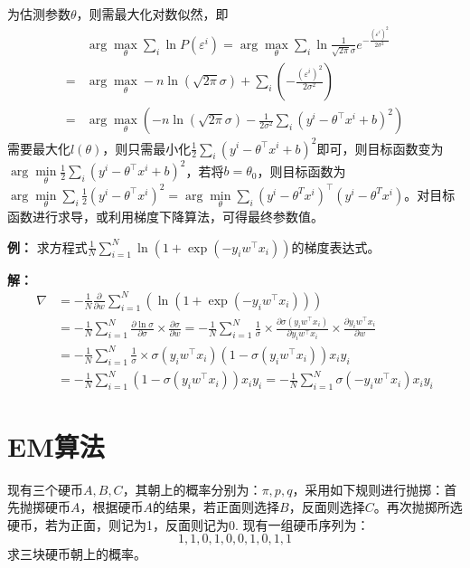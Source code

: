 \documentclass[12pt,a4paper]{article}
\begin{document}
  为估测参数$\theta$，则需最大化对数似然，即
  $$
  \begin{aligned}
    &\arg\max\limits_\theta \sum\limits_i \ln P(\varepsilon^i)= \arg\max\limits_\theta \sum\limits_i \ln \frac{1}{\sqrt{2\pi}\sigma} e^{-\frac{(\varepsilon^i)^2}{2\sigma^2}} \\ 
    =& \arg\max\limits_\theta -n\ln \left(\sqrt{2\pi} \sigma \right) + \sum_i \left(-\frac{(\varepsilon^i)^2}{2\sigma^2}\right) \\ 
    = & \arg\max\limits_\theta \left(-n\ln \left(\sqrt{2\pi} \sigma \right) - \frac{1}{2\sigma^2}\sum_i (y^i-\theta^\top x^i + b)^2 \right)
  \end{aligned}
  $$
  需要最大化$l(\theta)$，则只需最小化$\frac{1}{2}\sum_i (y^i-\theta^\top x^i + b)^2$即可，则目标函数变为$\arg\min\limits_\theta \frac{1}{2}\sum_i (y^i-\theta^\top x^i + b)^2$，若将$b=\theta_0$，则目标函数为$\arg\min\limits_\theta \sum\limits_i \frac{1}{2}(y^i-\theta^\top x^i)^2=\arg\min\limits_\theta \sum\limits_i (y^i-\theta^Tx^i)^\top(y^i-\theta^Tx^i)$。对目标函数进行求导，或利用梯度下降算法，可得最终参数值。

  \textbf{例：} 求方程式$\frac{1}{N}\sum\limits_{i=1}^N \ln(1+\exp(-y_iw^\top x_i))$的梯度表达式。

  \textbf{解：} 
  $$
  \begin{aligned}
    \nabla &=-\frac{1}{N} \frac{\partial}{\partial w} \sum\limits_{i=1}^N \left(\ln (1 + \exp(-y_i w^\top x_i))\right) \\ 
    &= -\frac{1}{N} \sum_{i=1}^N \frac{\partial \ln \sigma}{\partial \sigma} \times \frac{\partial \sigma}{\partial w} = -\frac{1}{N} \sum_{i=1}^N  \frac{1}{\sigma} \times \frac{\partial \sigma(y_iw^\top x_i)}{\partial y_iw^\top x_i} \times \frac{\partial y_iw^\top x_i}{\partial w} \\ 
    &= -\frac{1}{N} \sum_{i=1}^N  \frac{1}{\sigma} \times \sigma(y_i w^\top x_i)(1-\sigma(y_i w^\top x_i)) x_i y_i \\ 
    &= -\frac{1}{N} \sum_{i=1}^N (1-\sigma(y_i w^\top x_i))x_i y_i = -\frac{1}{N} \sum_{i=1}^N \sigma(-y_i w^\top x_i)x_i y_i
  \end{aligned}
  $$

  \section{EM算法}
  现有三个硬币$A, B,C$，其朝上的概率分别为：$\pi, p, q$，采用如下规则进行抛掷：首先抛掷硬币$A$，根据硬币$A$的结果，若正面则选择$B$，反面则选择$C$。再次抛掷所选硬币，若为正面，则记为1，反面则记为0. 现有一组硬币序列为：
  $$1,1,0,1,0,0,1,0,1,1$$
  求三块硬币朝上的概率。
\end{document}

